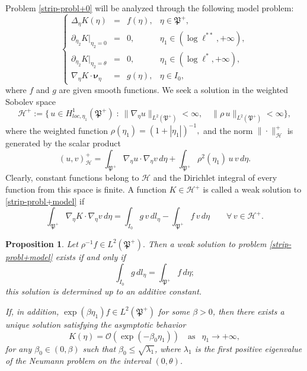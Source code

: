 \documentclass[reqno]{amsart}            %
\newtheorem{proposition}{Proposition}[section]
\numberwithin{equation}{section}
\begin{document}
	Problem \eqref{strip-probl+0} will be analyzed through the following model problem:
	\begin{equation}\label{strip-probl+model}
		\left\{
		\begin{array}{rcll}
			\Delta_\eta {K}(\eta) &=& f(\eta),
			& \eta\in \mathfrak{P}^+,
			\\[2mm]
			\partial_{\eta_2}{K}|_{\eta_2 = 0}  &=& 0, & \eta_1 \in (\log \ell^{**}, +\infty),
			\\[2mm]
			\partial_{\eta_2}{K}|_{\eta_2 = \theta} &=& 0, & \eta_1 \in (\log \ell^{*}, +\infty),
			\\[2mm]
			\nabla_\eta{K} \cdot \boldsymbol{\nu}_\eta &=& g(\eta), & \eta \in I_0,
		\end{array}
		\right.
	\end{equation}
	where $f$ and $g$ are given smooth functions.
	We seek a solution in the weighted Sobolev space
	$$
	\mathcal{H}^+ := \big\{\, 
	u \in H^1_{loc,\eta_1}(\mathfrak{P}^+) \; \colon \ 
	\|\nabla_{\eta} u\|_{L^2(\mathfrak{P}^+)} < \infty,\quad  
	\|\rho\, u\|_{L^2(\mathfrak{P}^+)} < \infty
	\big\},
	$$ 
	where the weighted function $\rho(\eta_1)=(1+ |\eta_1|)^{-1},$ and the norm $\| \cdot \|_\mathcal{H}^+$ is generated by the scalar product
	$$
	(u, v)_\mathcal{H}^+
	=  \int_{\mathfrak{P}^+}\nabla_\eta u \cdot \nabla_\eta v \, d\eta + \int_{\mathfrak{P}^+} \rho^2(\eta_1) \, u \, v \, d\eta .
	$$
	Clearly, constant functions belong to $\mathcal{H}$ and the Dirichlet integral of every function from this space is finite.
	A  function $K \in \mathcal{H}^+$ is called a weak solution to  \eqref{strip-probl+model}
	if
	\begin{equation}\label{int-identity-1}
		\int_{\mathfrak{P}^+}\nabla_{\eta}K\cdot\nabla_{\eta}v \, d\eta =    \int_{I_0} g\, v\, dl_\eta - \int_{\mathfrak{P}^+} f \, v\,d\eta \qquad \forall\, v \in \mathcal{H}^+.  
	\end{equation}
	\begin{proposition}\label{prop-2-2}
		Let $\rho^{-1} f\in L^2(\mathfrak{P}^+).$
		Then a weak solution to problem \eqref{strip-probl+model} exists if and only if 
		\begin{equation}\label{solvability-1}
			\int_{I_0} g\, dl_\eta = \int_{\mathfrak{P}^+} f \, d\eta;
		\end{equation}
		this solution is determined up to an additive constant.
		
		If, in addition, $\exp(\beta\eta_1)f \in L^2(\mathfrak{P}^+)$ for some $\beta>0$, then there exists a unique solution satisfying
		the asymptotic behavior
		\begin{equation}\label{asym-1}
			K(\eta) = \mathcal{O}\!\left(\exp(-\beta_0 \eta_1)\right)
			\quad \text{as } \ \ \eta_1 \to +\infty ,
		\end{equation}
		for any $\beta_0 \in (0,\beta)$ such that $\beta_0 \le \sqrt{\lambda_1}$, where $\lambda_1$ is the first positive eigenvalue of the Neumann problem on the interval $(0,\theta)$.
	\end{proposition}
\end{document}
